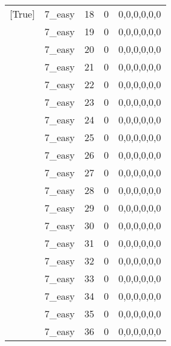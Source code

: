 \begin{tabular}{llrrl}
 [True]          & 7\_easy              &            18 &                     0 & 0,0,0,0,0,0   \\
 [True]          & 7\_easy              &            19 &                     0 & 0,0,0,0,0,0   \\
 [True]          & 7\_easy              &            20 &                     0 & 0,0,0,0,0,0   \\
 [True]          & 7\_easy              &            21 &                     0 & 0,0,0,0,0,0   \\
 [True]          & 7\_easy              &            22 &                     0 & 0,0,0,0,0,0   \\
 [True]          & 7\_easy              &            23 &                     0 & 0,0,0,0,0,0   \\
 [True]          & 7\_easy              &            24 &                     0 & 0,0,0,0,0,0   \\
 [True]          & 7\_easy              &            25 &                     0 & 0,0,0,0,0,0   \\
 [True]          & 7\_easy              &            26 &                     0 & 0,0,0,0,0,0   \\
 [True]          & 7\_easy              &            27 &                     0 & 0,0,0,0,0,0   \\
 [True]          & 7\_easy              &            28 &                     0 & 0,0,0,0,0,0   \\
 [True]          & 7\_easy              &            29 &                     0 & 0,0,0,0,0,0   \\
 [True]          & 7\_easy              &            30 &                     0 & 0,0,0,0,0,0   \\
 [True]          & 7\_easy              &            31 &                     0 & 0,0,0,0,0,0   \\
 [True]          & 7\_easy              &            32 &                     0 & 0,0,0,0,0,0   \\
 [True]          & 7\_easy              &            33 &                     0 & 0,0,0,0,0,0   \\
 [True]          & 7\_easy              &            34 &                     0 & 0,0,0,0,0,0   \\
 [True]          & 7\_easy              &            35 &                     0 & 0,0,0,0,0,0   \\
 [True]          & 7\_easy              &            36 &                     0 & 0,0,0,0,0,0   \\

\end{tabular}
